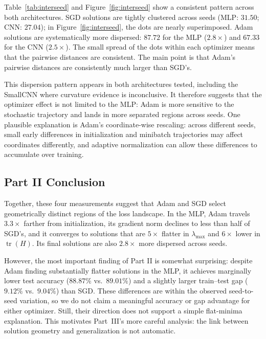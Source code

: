 \documentclass[11pt]{article}
\begin{document}
Table~\ref{tab:interseed} and Figure~\ref{fig:interseed} show a consistent pattern across both architectures.
SGD solutions are tightly clustered across seeds (MLP: $31.50$; CNN: $27.04$); in Figure~\ref{fig:interseed}, the dots are nearly superimposed.
Adam solutions are systematically more dispersed: $87.72$ for the MLP ($2.8\times$) and $67.33$ for the CNN ($2.5\times$).
The small spread of the dots within each optimizer means that the pairwise distances are consistent. The main point is that Adam's pairwise distances are consistently much larger than SGD's.

This dispersion pattern appears in both architectures tested, including the SmallCNN where curvature evidence is inconclusive. It therefore suggests that the optimizer effect is not limited to the MLP: Adam is more sensitive to the stochastic trajectory and lands in more separated regions across seeds.
One plausible explanation is Adam's coordinate-wise rescaling: across different seeds, small early differences in initialization and minibatch trajectories may affect coordinates differently, and adaptive normalization can allow these differences to accumulate over training.

\subsection{Part II Conclusion}

Together, these four measurements suggest that Adam and SGD select geometrically distinct regions of the loss landscape.
In the MLP, Adam travels $3.3\times$ farther from initialization, its gradient norm declines to less than half of SGD's, and it converges to solutions that are $5\times$ flatter in $\lambda_{\max}$ and $6\times$ lower in $\operatorname{tr}(H)$.
Its final solutions are also $2.8\times$ more dispersed across seeds.

However, the most important finding of Part II is somewhat surprising: despite Adam finding substantially flatter solutions in the MLP, it achieves marginally lower test accuracy ($88.87\%$ vs.\ $89.01\%$) and a slightly larger train--test gap ($9.12\%$ vs.\ $9.04\%$) than SGD.
These differences are within the observed seed-to-seed variation, so we do not claim a meaningful accuracy or gap advantage for either optimizer. Still, their direction does not support a simple flat-minima explanation.
This motivates Part~III's more careful analysis: the link between solution geometry and generalization is not automatic.
\end{document}
